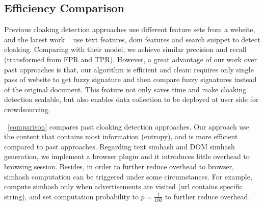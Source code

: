 \subsection{Efficiency Comparison}
\label{ss:efficiency}
Previous cloaking detection approaches use different feature sets from a website,
and the latest work ~\cite{wang2011cloak} use text features, dom features and
search snippet to detect cloaking. Comparing with their model, we achieve
similar precision and recall (transformed from FPR and TPR). However, a great
advantage of our work over past approaches is that, our algorithm is
efficient and clean: requires only single pass of website to get fuzzy signature and then
compare fuzzy signatures instead of the original document. This feature 
not only saves time and make cloaking detection scalable, 
but also enables data collection to be deployed at user side for crowdsourcing.

~\autoref{comparison} compares past cloaking detection approaches. Our approach
use the content that contains most information (entropy), and is more efficient
compared to past approaches. Regarding text simhash and DOM simhash generation,
we implement a browser plugin and it introduces little overhead to browsing
session. Besides, in order to further reduce overhead to browser, simhash
computation can be triggered under some circumstances. For example, compute
simhash only when advertisements are visited (url contains specific string), and
set computation probability to $p = \frac{1}{100}$ to further reduce overhead.






